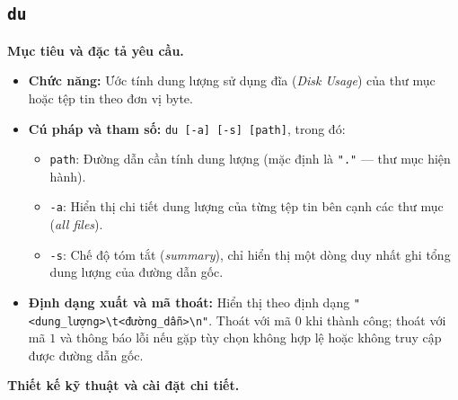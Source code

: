 \documentclass[12pt,a4paper]{article}
\begin{document}
\subsection{\texttt{du}}

\textbf{Mục tiêu và đặc tả yêu cầu.}
\begin{itemize}
  \item \textbf{Chức năng:} Ước tính dung lượng sử dụng đĩa (\textit{Disk Usage}) của thư mục hoặc tệp tin theo đơn vị byte.
  \item \textbf{Cú pháp và tham số:} \texttt{du [-a] [-s] [path]}, trong đó:
  \begin{itemize}
    \item \texttt{path}: Đường dẫn cần tính dung lượng (mặc định là \texttt{"."} --- thư mục hiện hành).
    \item \texttt{-a}: Hiển thị chi tiết dung lượng của từng tệp tin bên cạnh các thư mục (\textit{all files}).
    \item \texttt{-s}: Chế độ tóm tắt (\textit{summary}), chỉ hiển thị một dòng duy nhất ghi tổng dung lượng của đường dẫn gốc.
  \end{itemize}
  \item \textbf{Định dạng xuất và mã thoát:} Hiển thị theo định dạng \texttt{"<dung\_lượng>\textbackslash t<đường\_dẫn>\textbackslash n"}. Thoát với mã $0$ khi thành công; thoát với mã $1$ và thông báo lỗi nếu gặp tùy chọn không hợp lệ hoặc không truy cập được đường dẫn gốc.
\end{itemize}

\textbf{Thiết kế kỹ thuật và cài đặt chi tiết.}
\end{document}
